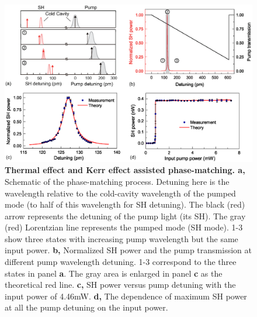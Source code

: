 \documentclass[a4paper,8pt,hyperref, twocolumn]{article}
\begin{document}
\begin{figure}[!ht]
\centering
\includegraphics[width=17cm]{try_ed3.eps}
\caption{\textbf{Thermal effect and Kerr effect assisted phase-matching. a, }Schematic of the phase-matching process. Detuning here is the wavelength relative to the cold-cavity wavelength of the pumped mode (to half of this wavelength for SH detuning). The black (red) arrow represents the detuning of the pump light (its SH). The gray (red) Lorentzian line represents the pumped mode (SH mode). 1-3 show three states with increasing pump wavelength but the same input power. \textbf{b, }Normalized SH power and the pump transmission at different pump wavelength detuning. 1-3 correspond to the three states in panel \textbf{a}. The gray area is enlarged in panel \textbf{c} as the theoretical red line. \textbf{c, }SH power versus pump detuning with the input power of 4.46mW. \textbf{d, }The dependence of maximum SH power at all the pump detuning on the input power.}
\label{pic:Fig2}
\end{figure}
\end{document}

